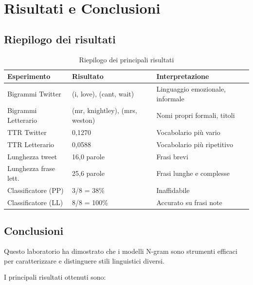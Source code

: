 \documentclass[12pt, a4paper]{article}
\begin{document}
\section{Risultati e Conclusioni}

\subsection{Riepilogo dei risultati}

\begin{table}[H]
\centering
\begin{tabular}{lll}
\toprule
\textbf{Esperimento} & \textbf{Risultato} & \textbf{Interpretazione} \\
\midrule
Bigrammi Twitter     & (i, love), (cant, wait) &
Linguaggio emozionale, informale \\
Bigrammi Letterario  & (mr, knightley), (mrs, weston) &
Nomi propri formali, titoli \\
TTR Twitter          & 0,1270 &
Vocabolario più vario \\
TTR Letterario       & 0,0588 &
Vocabolario più ripetitivo \\
Lunghezza tweet      & 16,0 parole &
Frasi brevi \\
Lunghezza frase lett. & 25,6 parole &
Frasi lunghe e complesse \\
Classificatore (PP)  & 3/8 = 38\% &
Inaffidabile \\
Classificatore (LL)  & 8/8 = 100\% &
Accurato su frasi note \\
\bottomrule
\end{tabular}
\caption{Riepilogo dei principali risultati}
\end{table}

\subsection{Conclusioni}

Questo laboratorio ha dimostrato che i modelli N-gram sono strumenti
efficaci per caratterizzare e distinguere stili linguistici diversi.

I principali risultati ottenuti sono:
\end{document}
